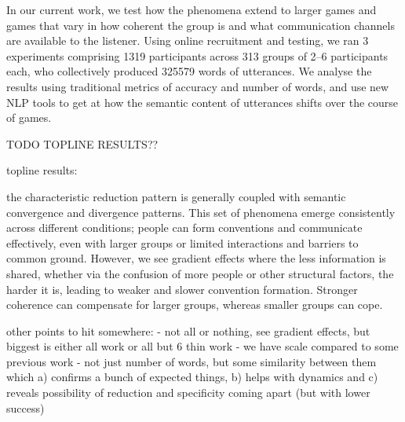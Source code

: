 \documentclass[
  english,
  a4paper,
]{article}
\begin{document}
In our current work, we test how the phenomena extend to larger games and games that vary in how coherent the group is and what communication channels are available to the listener. Using online recruitment and testing, we ran 3 experiments comprising 1319 participants across 313 groups of 2--6 participants each, who collectively produced 325579 words of utterances. We analyse the results using traditional metrics of accuracy and number of words, and use new NLP tools to get at how the semantic content of utterances shifts over the course of games.

TODO TOPLINE RESULTS??

topline results:

the characteristic reduction pattern is generally coupled with semantic convergence and divergence patterns. This set of phenomena emerge consistently across different conditions; people can form conventions and communicate effectively, even with larger groups or limited interactions and barriers to common ground. However, we see gradient effects where the less information is shared, whether via the confusion of more people or other structural factors, the harder it is, leading to weaker and slower convention formation. Stronger coherence can compensate for larger groups, whereas smaller groups can cope.

other points to hit somewhere:
- not all or nothing, see gradient effects, but biggest is either all work or all but 6 thin work
- we have scale compared to some previous work
- not just number of words, but some similarity between them which a) confirms a bunch of expected things, b) helps with dynamics and c) reveals possibility of reduction and specificity coming apart (but with lower success)






\end{document}
